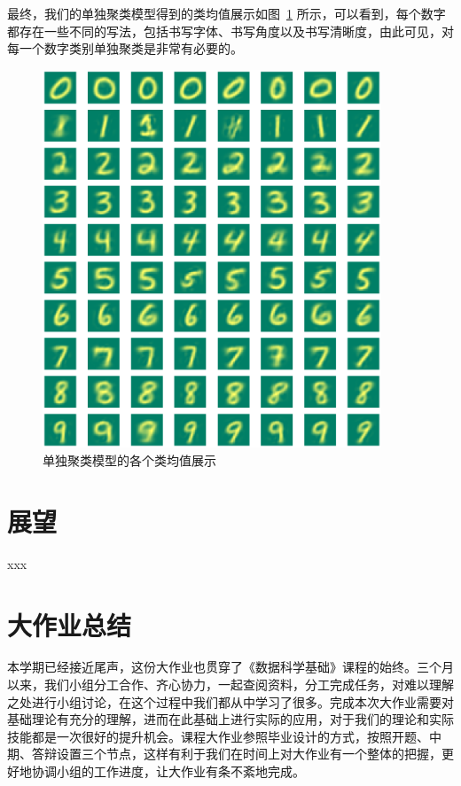 \documentclass[UTF8]{ctexart}
\begin{document}
最终，我们的单独聚类模型得到的类均值展示如图~\ref{fig:2-class_means} 所示，可以看到，每个数字都存在一些不同的写法，包括书写字体、书写角度以及书写清晰度，由此可见，对每一个数字类别单独聚类是非常有必要的。

\begin{figure}[!h]
  \centering
  \includegraphics[width=0.9\textwidth]{figures/digits.pdf}
  \vspace{-.3cm}\caption{单独聚类模型的各个类均值展示}\label{fig:2-class_means}
\end{figure}

\section{展望}
xxx

\section{大作业总结}
本学期已经接近尾声，这份大作业也贯穿了《数据科学基础》课程的始终。三个月以来，我们小组分工合作、齐心协力，一起查阅资料，分工完成任务，对难以理解之处进行小组讨论，在这个过程中我们都从中学习了很多。完成本次大作业需要对基础理论有充分的理解，进而在此基础上进行实际的应用，对于我们的理论和实际技能都是一次很好的提升机会。课程大作业参照毕业设计的方式，按照开题、中期、答辩设置三个节点，这样有利于我们在时间上对大作业有一个整体的把握，更好地协调小组的工作进度，让大作业有条不紊地完成。
\end{document}
